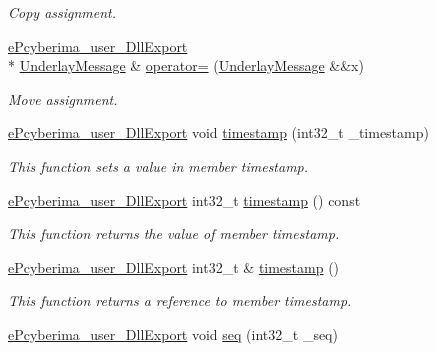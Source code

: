 \begin{DoxyCompactItemize}
\begin{DoxyCompactList}\small\item\em Copy assignment. \end{DoxyCompactList}\item 
\hyperlink{underlay__message_8h_a72796233f09f587d949ca1aa9842453d}{e\-Pcyberima\-\_\-user\-\_\-\-Dll\-Export} \\*
\hyperlink{classapollo_1_1cyber_1_1transport_1_1UnderlayMessage}{Underlay\-Message} \& \hyperlink{classapollo_1_1cyber_1_1transport_1_1UnderlayMessage_a5c454305c8f16afc6f1277a9f11bbff3}{operator=} (\hyperlink{classapollo_1_1cyber_1_1transport_1_1UnderlayMessage}{Underlay\-Message} \&\&x)
\begin{DoxyCompactList}\small\item\em Move assignment. \end{DoxyCompactList}\item 
\hyperlink{underlay__message_8h_a72796233f09f587d949ca1aa9842453d}{e\-Pcyberima\-\_\-user\-\_\-\-Dll\-Export} void \hyperlink{classapollo_1_1cyber_1_1transport_1_1UnderlayMessage_a873b590280314d3e5b347fe47f206ac2}{timestamp} (int32\-\_\-t \-\_\-timestamp)
\begin{DoxyCompactList}\small\item\em This function sets a value in member timestamp. \end{DoxyCompactList}\item 
\hyperlink{underlay__message_8h_a72796233f09f587d949ca1aa9842453d}{e\-Pcyberima\-\_\-user\-\_\-\-Dll\-Export} int32\-\_\-t \hyperlink{classapollo_1_1cyber_1_1transport_1_1UnderlayMessage_a49537e67085282df5adc4cf5893f247e}{timestamp} () const 
\begin{DoxyCompactList}\small\item\em This function returns the value of member timestamp. \end{DoxyCompactList}\item 
\hyperlink{underlay__message_8h_a72796233f09f587d949ca1aa9842453d}{e\-Pcyberima\-\_\-user\-\_\-\-Dll\-Export} int32\-\_\-t \& \hyperlink{classapollo_1_1cyber_1_1transport_1_1UnderlayMessage_a9df36e0019c84f90af3945a7fee4f94e}{timestamp} ()
\begin{DoxyCompactList}\small\item\em This function returns a reference to member timestamp. \end{DoxyCompactList}\item 
\hyperlink{underlay__message_8h_a72796233f09f587d949ca1aa9842453d}{e\-Pcyberima\-\_\-user\-\_\-\-Dll\-Export} void \hyperlink{classapollo_1_1cyber_1_1transport_1_1UnderlayMessage_a2b29bda9d943dab9f500615af63f06e9}{seq} (int32\-\_\-t \-\_\-seq)

\end{DoxyCompactItemize}
